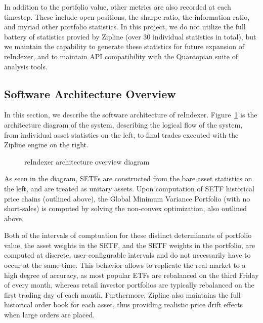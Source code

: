 \documentclass[../main.tex]{subfiles}
\begin{document}
In addition to the portfolio value, other metrics are also recorded at each timestep. These include open positions, the sharpe ratio, the information ratio, and myriad other portfolio statistics. In this project, we do not utilize the full battery of statistics provied by Zipline (over 30 individual statistics in total), but we maintain the capability to generate these statistics for future expansion of reIndexer, and to maintain API compatibility with the Quantopian suite of analysis tools.

\pagebreak

\subsection{Software Architecture Overview}

In this section, we describe the software architecture of reIndexer. Figure~\ref{fig:candidate_universe_ranking:reindexer_architecture} is the architecture diagram of the system, describing the logical flow of the system, from individual asset statistics on the left, to final trades executed with the Zipline engine on the right.

\begin{figure}[h!]
    \centering
    \caption{reIndexer architecture overview diagram}
    \label{fig:candidate_universe_ranking:reindexer_architecture}
\end{figure}

As seen in the diagram, SETFs are constructed from the bare asset statistics on the left, and are treated as unitary assets. Upon computation of SETF historical price chains (outlined above), the Global Minimum Variance Portfolio (with no short-sales) is computed by solving the non-convex optimization, also outlined above.

Both of the intervals of comptuation for these distinct determinants of portfolio value, the asset weights in the SETF, and the SETF weights in the portfolio, are computed at discrete, user-configurable intervals and do not necessarily have to occur at the same time. This behavior allows to replicate the real market to a high degree of accuracy, as most popular ETFs are rebalanced on the third Friday of every month, whereas retail investor portfolios are typically rebalanced on the first trading day of each month. Furthermore, Zipline also maintains the full historical order book for each asset, thus providing realistic price drift effects when large orders are placed.
\end{document}
